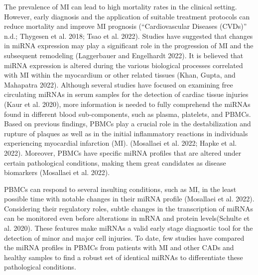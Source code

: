 \documentclass[
]{article}
\begin{document}
The prevalence of MI can lead to high mortality rates in the clinical
setting. However, early diagnosis and the application of suitable
treatment protocols can reduce mortality and improve MI prognosis
({``Cardiovascular Diseases ({CVDs})''} n.d.; Thygesen et al. 2018; Tsao
et al. 2022). Studies have suggested that changes in miRNA expression
may play a significant role in the progression of MI and the subsequent
remodeling (Laggerbauer and Engelhardt 2022). It is believed that miRNA
expression is altered during the various biological processes correlated
with MI within the myocardium or other related tissues (Khan, Gupta, and
Mahapatra 2022). Although several studies have focused on examining free
circulating miRNAs in serum samples for the detection of cardiac tissue
injuries (Kaur et al. 2020), more information is needed to fully
comprehend the miRNAs found in different blood sub-components, such as
plasma, platelets, and PBMCs. Based on previous findings, PBMCs play a
crucial role in the destabilization and rupture of plaques as well as in
the initial inflammatory reactions in individuals experiencing
myocardial infarction (MI). (Mosallaei et al. 2022; Hapke et al. 2022).
Moreover, PBMCs have specific miRNA profiles that are altered under
certain pathological conditions, making them great candidates as disease
biomarkers (Mosallaei et al. 2022).

PBMCs can respond to several insulting conditions, such as MI, in the
least possible time with notable changes in their miRNA profile
(Mosallaei et al. 2022). Considering their regulatory roles, subtle
changes in the transcription of miRNAs can be monitored even before
alterations in mRNA and protein levels(Schulte et al. 2020). These
features make miRNAs a valid early stage diagnostic tool for the
detection of minor and major cell injuries. To date, few studies have
compared the miRNA profiles in PBMCs from patients with MI and other
CADs and healthy samples to find a robust set of identical miRNAs to
differentiate these pathological conditions.
\end{document}
